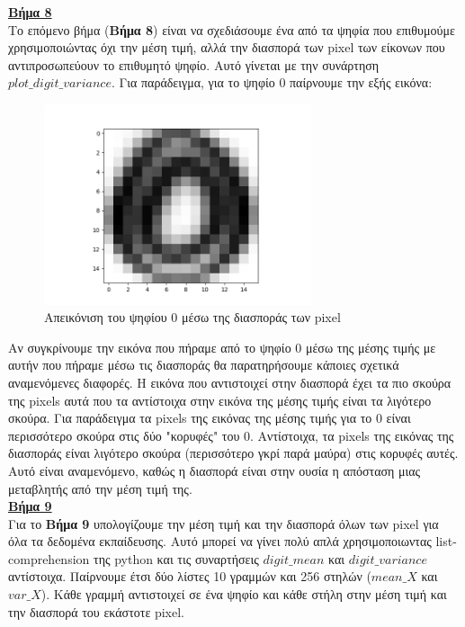 \documentclass[11pt]{article} %
\begin{document}
\underline{\textbf{Βήμα 8}}\\

Το επόμενο βήμα (\textbf{Βήμα 8}) είναι να σχεδιάσουμε ένα από τα ψηφία που επιθυμούμε χρησιμοποιώντας όχι την μέση τιμή, αλλά την διασπορά των pixel των είκονων που αντιπροσωπεύουν το επιθυμητό ψηφίο. Αυτό γίνεται με την συνάρτηση $plot\_digit\_variance$. Για παράδειγμα, για το ψηφίο $0$ παίρνουμε την εξής εικόνα:

\begin{figure}[H]
    \centering
    \includegraphics[width=0.7\textwidth]{plots/variance_0}
    \caption{Απεικόνιση του ψηφίου $0$ μέσω της διασποράς των pixel}
    \label{fig:var_0}
\end{figure}



Αν συγκρίνουμε την εικόνα που πήραμε από το ψηφίο 0 μέσω της μέσης τιμής με αυτήν που πήραμε μέσω τις διασποράς θα παρατηρήσουμε κάποιες σχετικά αναμενόμενες διαφορές. Η εικόνα που αντιστοιχεί στην διασπορά έχει τα πιο σκούρα της pixels αυτά που τα αντίστοιχα στην εικόνα της μέσης τιμής είναι τα λιγότερο σκούρα. Για παράδειγμα τα pixels της εικόνας της μέσης τιμής για το $0$ είναι περισσότερο σκούρα στις δύο "κορυφές" του $0$. Αντίστοιχα, τα pixels της εικόνας της διασποράς είναι λιγότερο σκούρα (περισσότερο γκρί παρά μαύρα) στις κορυφές αυτές. Αυτό είναι αναμενόμενο, καθώς η διασπορά είναι στην ουσία η απόσταση μιας μεταβλητής από την μέση τιμή της. \\

\underline{\textbf{Βήμα 9}}\\

Για το \textbf{Βήμα 9} υπολογίζουμε την μέση τιμή και την διασπορά όλων των pixel για όλα τα δεδομένα εκπαίδευσης. Αυτό μπορεί να γίνει πολύ απλά χρησιμοποιωντας list-comprehension της python και τις συναρτήσεις $digit\_mean$ και $digit\_variance$ αντίστοιχα. Παίρνουμε έτσι δύο λίστες 10 γραμμών και 256 στηλών ($mean\_X$ και $var\_X$). Κάθε γραμμή αντιστοιχεί σε ένα ψηφίο και κάθε στήλη στην μέση τιμή και την διασπορά του εκάστοτε pixel. \\
\end{document}
